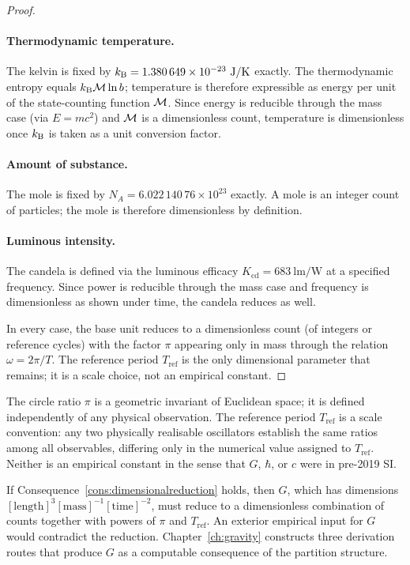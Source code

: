 \begin{proof}
\paragraph{Thermodynamic temperature.}
The kelvin is fixed by $k_{\mathrm{B}} = 1.380\,649\times10^{-23}~\mathrm{J/K}$ exactly.
The thermodynamic entropy equals $k_{\mathrm{B}}\mathcal{M}\ln b$; temperature is therefore
expressible as energy per unit of the state-counting function $\mathcal{M}$.
Since energy is reducible through the mass case (via $E = mc^{2}$) and
$\mathcal{M}$ is a dimensionless count, temperature is dimensionless once $k_{\mathrm{B}}$
is taken as a unit conversion factor.

\paragraph{Amount of substance.}
The mole is fixed by $N_{A} = 6.022\,140\,76\times10^{23}$ exactly.
A mole is an integer count of particles; the mole is therefore dimensionless
by definition.

\paragraph{Luminous intensity.}
The candela is defined via the luminous efficacy $K_{\mathrm{cd}} = 683~\mathrm{lm/W}$
at a specified frequency.
Since power is reducible through the mass case and frequency is dimensionless
as shown under time, the candela reduces as well.

In every case, the base unit reduces to a dimensionless count (of integers or
reference cycles) with the factor $\pi$ appearing only in mass through the
relation $\omega = 2\pi/T$.
The reference period $T_{\mathrm{ref}}$ is the only dimensional parameter that
remains; it is a scale choice, not an empirical constant.
\end{proof}

\begin{remark}
The circle ratio $\pi$ is a geometric invariant of Euclidean space; it is
defined independently of any physical observation.
The reference period $T_{\mathrm{ref}}$ is a scale convention: any two physically
realisable oscillators establish the same ratios among all observables,
differing only in the numerical value assigned to $T_{\mathrm{ref}}$.
Neither is an empirical constant in the sense that $G$, $\hbar$, or $c$
were in pre-2019 SI.
\end{remark}

\begin{remark}
If Consequence~\ref{cons:dimensionalreduction} holds, then $G$, which has
dimensions $[\mathrm{length}]^{3}[\mathrm{mass}]^{-1}[\mathrm{time}]^{-2}$,
must reduce to a dimensionless combination of counts together with powers of
$\pi$ and $T_{\mathrm{ref}}$.
An exterior empirical input for $G$ would contradict the reduction.
Chapter~\ref{ch:gravity} constructs three derivation routes that produce $G$
as a computable consequence of the partition structure.
\end{remark}

